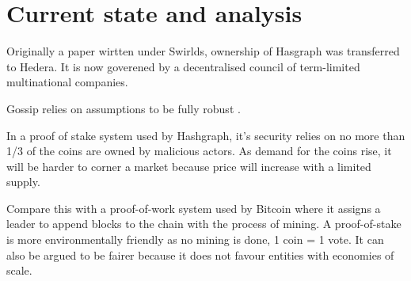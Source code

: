 \section{Current state and analysis}

Originally a paper wirtten under Swirlds, ownership of Hasgraph was transferred to Hedera. It is now goverened by a decentralised council of term-limited multinational companies.


Gossip relies on assumptions to be fully robust \cite{alvisi}.

In a proof of stake system used by Hashgraph, it's security relies on no more than 1/3 of the coins are owned by malicious actors. As demand for the coins rise, it will be harder to corner a market because price will increase with a limited supply.

Compare this with a proof-of-work system used by Bitcoin where it assigns a leader to append blocks to the chain with the process of mining. A proof-of-stake is more environmentally friendly as no mining is done, 1 coin = 1 vote. It can also be argued to be fairer because it does not favour entities with economies of scale.

